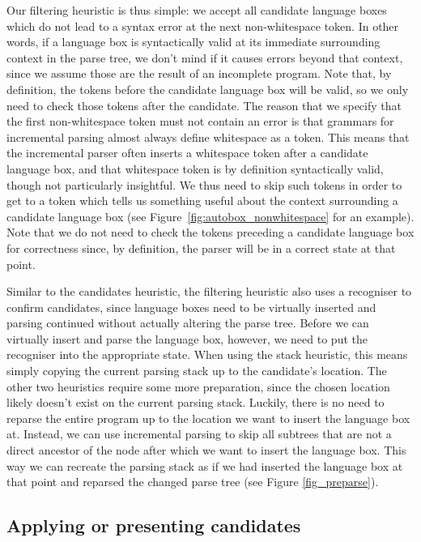 \documentclass[sigplan,screen]{acmart}\settopmatter{printfolios=true,printccs=false,printacmref=false}
\begin{document}
Our filtering heuristic is thus simple: we accept all candidate language
boxes which do not lead to a syntax error at the next non-whitespace token. In other
words, if a language box is syntactically valid at its immediate surrounding
context in the parse tree, we don't mind if it causes errors beyond that
context, since we assume those are the result of an
incomplete program. Note that, by definition, the tokens before the candidate
language box will be valid, so we only need to check those tokens after the
candidate. The reason that we specify that the first non-whitespace
token must not contain an error is that grammars for incremental parsing almost
always define whitespace as a token. This means that the incremental parser
often inserts a whitespace token after a candidate language box, and that
whitespace token is by definition syntactically valid, though not particularly
insightful. We thus need to skip such tokens in order to get to a
token which tells us something useful about the context surrounding a candidate
language box (see Figure~\ref{fig:autobox_nonwhitespace} for an example).
Note that we do not need to check the tokens preceding a candidate language box
for correctness since, by definition, the parser will be in a correct state
at that point.

Similar to the candidates heuristic, the filtering heuristic also uses a
recogniser to confirm candidates, since language boxes need to be virtually
inserted and parsing continued without actually altering the parse tree. Before
we can virtually insert and parse the language box, however, we need to put the
recogniser into the appropriate state. When using the stack heuristic, this
means simply copying the current parsing stack up to the candidate's location.
The other two heuristics require some more preparation, since the chosen
location likely doesn't exist on the current parsing stack. Luckily, there is
no need to reparse the entire program up to the location we want to insert the
language box at. Instead, we can use incremental parsing to skip all subtrees
that are not a direct ancestor of the node after which we want to insert the
language box. This way we can recreate the parsing stack as if we had inserted
the language box at that point and reparsed the changed parse tree (see Figure
\ref{fig_preparse}).

\subsection{Applying or presenting candidates}
\end{document}
